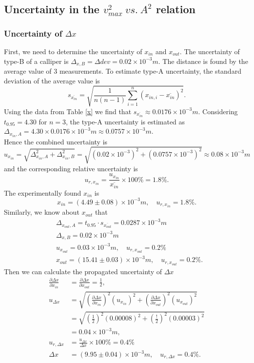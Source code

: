 \subsection{Uncertainty in the $v_{max}^2\ vs.\ A^2$ relation}
\subsubsection{Uncertainty of $\Delta x$}
    First, we need to determine the uncertainty of $x_{in}$ and $x_{out}$. The uncertainty of type-B of a calliper is $\Delta_{x,B}=\Delta{dev}=0.02\times10^{-3}m$. The distance is found by the average value of 3 measurements. To estimate  type-A uncertainty, the standard deviation of the average value is 
    \[
        s_{\overline{x_{in}}}=\sqrt{\frac{1}{n(n-1)}\sum_{i=1}^n(x_{in,i}-\overline{x_{in}})^2}.
    \]
    Using the data from Table \ref{x} we find that $s_{\overline{x_{in}}}\approx 0.0176\times10^{-3}m$. Considering $t_{0.95}=4.30$ for $n=3$, the type-A uncertainty is estimated as $\Delta_{x_{in},A}=4.30\times0.0176\times10^{-3}m\approx 0.0757\times10^{-3}m$.\\
    Hence the combined uncertainty is
    \[
         u_{x_{in}}=\sqrt{\Delta_{x_{in},A}^2+\Delta_{x_{in},B}^2}=\sqrt{(0.02\times10^{-3})^2+(0.0757\times10^{-3})^2}\approx 0.08\times10^{-3}m
    \]
     and the corresponding relative uncertainty is 
    \[
        u_{r,x_{in}}=\frac{u_{x_{in}}}{\overline{x_{in}}}\times 100\%=1.8\%.
    \]
    The experimentally found $x_{in}$ is 
    \[
        x_{in}=(4.49\pm 0.08) \times10^{-3}m,\quad u_{r,x_{in}}=1.8\%.
    \]
    Similarly, we know about $x_{out}$ that
    \[
    \begin{split}
        &\Delta_{x_{out},A}=t_{0.95}\cdot s_{\overline{x_{out}}}=0.0287\times10^{-3}m\\
        &\Delta_{x,B}=0.02\times10^{-3}m\\
        &u_{x_{out}}=0.03\times10^{-3}m,\quad
        u_{r,x_{out}}=0.2\%\\[0.4cm]
        &x_{out}=(15.41\pm 0.03) \times10^{-3}m,\quad u_{r,x_{out}}=0.2\%.
    \end{split}
    \]
    Then we can calculate the propagated uncertainty of $\Delta x$
    \[
    \begin{split}
        \frac{\partial\Delta x}{\partial x_{in}}&=\frac{\partial\Delta x}{\partial x_{out}}=\frac{1}{2},\\
        u_{\Delta x}&=\sqrt{(\frac{\partial\Delta x}{\partial x_{in}})^2(u_{x_{in}})^2+(\frac{\partial\Delta x}{\partial x_{out}})^2(u_{x_{out}})^2}\\
        &=\sqrt{(\frac{1}{2})^2(0.00008)^2+(\frac{!}{2})^2(0.00003)^2}\\
        &=0.04\times10^{-3}m,\\
        u_{r,\Delta x}&=\frac{u_{\Delta x}}{\Delta x}\times100\%=0.4\%\\[0.4cm]
        \Delta x&=(9.95\pm0.04)\times10^{-3}m,\quad u_{r,\Delta x}=0.4\%.
    \end{split}
    \]
